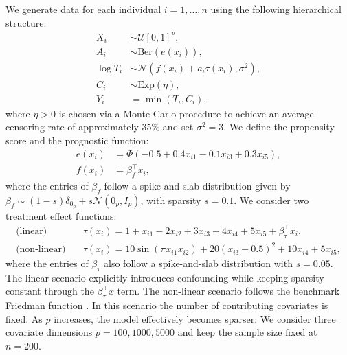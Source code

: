 We generate data for each individual $i = 1, \ldots, n$ using the following hierarchical structure:
\begin{equation}
    \begin{split}
        X_i &\sim \mathcal{U}[0,1]^p, \\
        A_i &\sim \text{Ber}(e(x_i)), \\
        \log T_i &\sim \mathcal{N}(f(x_i) + a_i \tau(x_i), \sigma^2), \\
        C_i &\sim \text{Exp}(\eta), \\
        Y_i &= \min(T_i, C_i),
    \end{split}
\end{equation}
where $\eta>0$ is chosen via a Monte Carlo procedure to achieve an average censoring rate of approximately 35\% and set $\sigma^2 = 3$.
We define the propensity score and the prognostic function:
\begin{equation}
\begin{split}
    e(x_i) &= \Phi(-0.5 + 0.4x_{i1} - 0.1x_{i3} + 0.3x_{i5}), \\
    f(x_i) &= \beta_f^\top x_i,
\end{split}
\end{equation}
where the entries of $\beta_f$ follow a spike-and-slab distribution given by $\beta_f \sim (1-s)\delta_{0_p} + s\mathcal{N}(0_p,I_p)$, with sparsity $s = 0.1$.
We consider two treatment effect functions:
\begin{equation}
\begin{split}
    \text{(linear)} \quad & \tau(x_i) = 1 + x_{i1} - 2x_{i2} + 3x_{i3} - 4x_{i4} + 5x_{i5} + \beta_\tau^\top x_i, \\
    \text{(non-linear)} \quad & \tau(x_i) = 10 \sin(\pi x_{i1} x_{i2}) + 20 (x_{i3} - 0.5)^2 + 10x_{i4} + 5x_{i5},
\end{split}
\end{equation}
where the entries of $\beta_\tau$ also follow a spike-and-slab distribution with $s = 0.05$.
The linear scenario explicitly introduces confounding while keeping sparsity constant through the $\beta_\tau^\top x$ term. 
The non-linear scenario follows the benchmark Friedman function \citep{Friedman}.
In this scenario the number of contributing covariates is fixed.
As $p$ increases, the model effectively becomes sparser. 
We consider three covariate dimensions $p = {100, 1000, 5000}$ and keep the sample size fixed at $n = 200$. 


